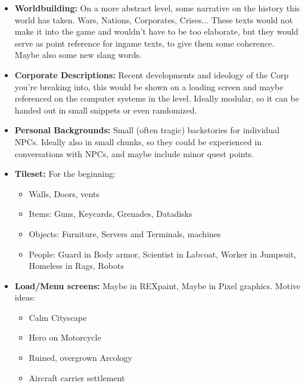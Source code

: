 \documentclass[11pt,a4paper]{article}
\begin{document}
\begin{itemize}
    \item \textbf{Worldbuilding:} On a more abstract level, some narrative on the history this world has taken.
                Wars, Nations, Corporates, Crises... These texts would not make it into the game and wouldn't have to
                be too elaborate, but they would serve as point reference for ingame texts, to give them some coherence.
                Maybe also some new slang words.
    \item \textbf{Corporate Descriptions:} Recent developments and ideology of the Corp you're breaking into, this would
                be shown on a loading screen and maybe referenced on the computer systems in the level. Ideally modular,
                so it can be handed out in small snippets or even randomized.
    \item \textbf{Personal Backgrounds:} Small (often tragic) backstories for individual NPCs. Ideally also in small
                chunks, so they could be experienced in conversations with NPCs, and maybe include minor quest points.
    \item \textbf{Tileset:} For the beginning:
        \begin{itemize}
            \item Walls, Doors, vents
            \item Items: Guns, Keycards, Grenades, Datadisks
            \item Objects: Furniture, Servers and Terminals, machines
            \item People: Guard in Body armor, Scientist in Labcoat,
                          Worker in Jumpsuit, Homeless in Rags, Robots
        \end{itemize}
    \item \textbf{Load/Menu screens:} Maybe in REXpaint, Maybe in Pixel graphics. Motive ideas:
        \begin{itemize}
            \item Calm Cityscape
            \item Hero on Motorcycle
            \item Ruined, overgrown Arcology
            \item Aircraft carrier settlement
        \end{itemize}

\end{itemize}
\end{document}
